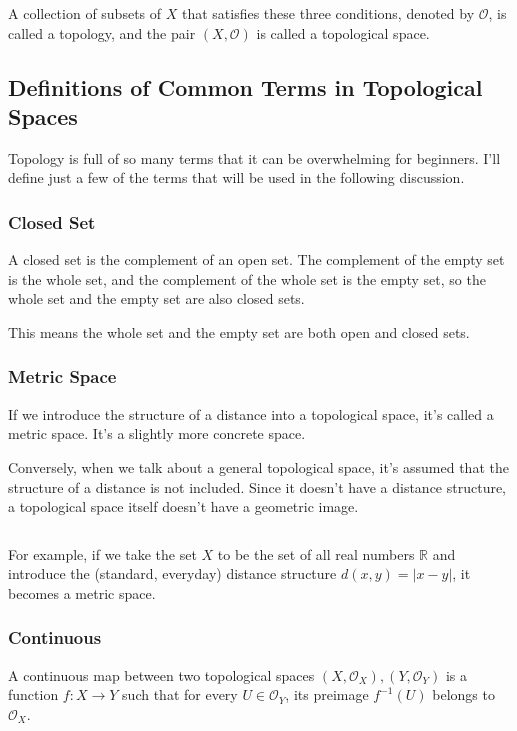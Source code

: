 \documentclass[article,letterpaper,12pt]{jsarticle}
\begin{document}
A collection of subsets of $X$ that satisfies these three conditions, denoted by $\mathcal{O}$, is called a topology, and the pair $(X, {\mathcal O})$ is called a topological space.

\subsection{Definitions of Common Terms in Topological Spaces}

Topology is full of so many terms that it can be overwhelming for beginners. I'll define just a few of the terms that will be used in the following discussion.

\subsubsection{Closed Set}

A closed set is the complement of an open set.
The complement of the empty set is the whole set, and the complement of the whole set is the empty set, so the whole set and the empty set are also closed sets.

This means the whole set and the empty set are both open and closed sets.


\subsubsection{Metric Space}

If we introduce the structure of a distance into a topological space, it's called a metric space. It's a slightly more concrete space.

Conversely, when we talk about a general topological space, it's assumed that the structure of a distance is not included.
Since it doesn't have a distance structure, a topological space itself doesn't have a geometric image.

${}$

For example, if we take the set $X$ to be the set of all real numbers $\mathbb{R}$ and introduce the (standard, everyday) distance structure $d(x,y) = |x-y|$, it becomes a metric space.

\subsubsection{Continuous}

A continuous map between two topological spaces $(X, {\mathcal O}_{X}), (Y, {\mathcal O}_{Y})$ is a function
$f: X \to Y$ such that for every $U \in {\mathcal O}_{Y}$, its preimage
$f^{-1}(U)$ belongs to ${\mathcal O}_{X}$.
\end{document}

